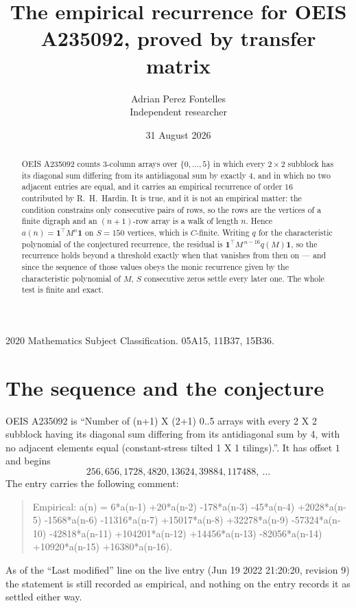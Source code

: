 \documentclass[11pt,a4paper]{article}
\title{The empirical recurrence for OEIS A235092, proved by transfer matrix}
\author{Adrian Perez Fontelles\\ \small Independent researcher}
\date{31 August 2026}
\theoremstyle{plain}
\theoremstyle{definition}
\begin{document}
\maketitle

\begin{abstract}
OEIS A235092 counts $3$-column arrays over $\{0,\dots,5\}$ in which every
$2\times2$ subblock has its diagonal sum differing from its antidiagonal sum by
exactly $4$, and in which no two adjacent entries are equal, and it
carries an empirical recurrence of order $16$ contributed by R.~H.~Hardin. It is true,
and it is not an empirical matter: the condition constrains only consecutive pairs of rows,
so the rows are the vertices of a finite digraph and an $(n+1)$-row array is a walk of
length $n$. Hence $a(n)=\mathbf{1}^{\!\top}M^{n}\mathbf{1}$ on $S=150$ vertices, which
is $C$-finite. Writing $q$ for the characteristic polynomial of the conjectured recurrence,
the residual is $\mathbf{1}^{\!\top}M^{\,n-16}q(M)\mathbf{1}$, so the recurrence
holds beyond a threshold exactly when that vanishes from then on --- and since the sequence
of those values obeys the monic recurrence given by the characteristic polynomial of $M$,
$S$ consecutive zeros settle every later one. The whole test is finite and exact.
\end{abstract}

\noindent\small 2020 Mathematics Subject Classification. 05A15, 11B37, 15B36.\normalsize

\section{The sequence and the conjecture}

OEIS A235092 is ``Number of (n+1) X (2+1) 0..5 arrays with every 2 X 2 subblock having its diagonal sum differing from its antidiagonal sum by 4, with no adjacent elements equal (constant-stress tilted 1 X 1 tilings).''. It has offset
$1$ and begins
\[
256, 656, 1728, 4820, 13624, 39884, 117488,\ \dots
\]
The entry carries the following comment:
\begin{quote}\small
Empirical: a(n) = 6*a(n-1) +20*a(n-2) -178*a(n-3) -45*a(n-4) +2028*a(n-5) -1568*a(n-6) -11316*a(n-7) +15017*a(n-8) +32278*a(n-9) -57324*a(n-10) -42818*a(n-11) +104201*a(n-12) +14456*a(n-13) -82056*a(n-14) +10920*a(n-15) +16380*a(n-16).
\end{quote}
As of the ``Last modified'' line on the live entry (Jun 19 2022 21:20:20, revision 9) the statement is
still recorded as empirical, and nothing on the entry records it as settled either way.
\end{document}

